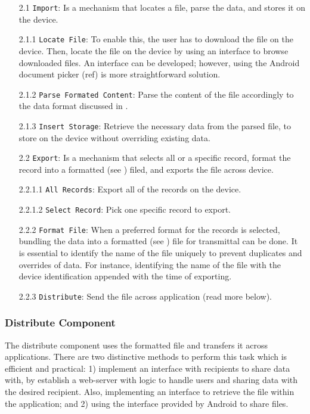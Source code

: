 \begin{itemize}
    \item[2.1] \verb|Import|: Is a mechanism that locates a file, parse the data, and stores it on the device.
    \item[2.1.1] \verb|Locate File|: To enable this, the user has to download the file on the device. Then, locate the file on the device by using an interface to browse downloaded files. An interface can be developed; however, using the Android document picker (ref) is more straightforward solution.
    \item[2.1.2] \verb|Parse Formated Content|: Parse the content of the file accordingly to the data format discussed in .
    \item[2.1.3] \verb|Insert Storage|: Retrieve the necessary data from the parsed file, to store on the device without overriding existing data.   
    \item[2.2] \verb|Export|: Is a mechanism that selects all or a specific record, format the record into a formatted (see ) filed, and exports the file across device. 
    \item[2.2.1.1] \verb|All Records|: Export all of the records on the device.
    \item[2.2.1.2] \verb|Select Record|: Pick one specific record to export. 
    \item[2.2.2] \verb|Format File|: When a preferred format for the records is selected, bundling the data into a formatted (see ) file for transmittal can be done. It is essential to identify the name of the file uniquely to prevent duplicates and overrides of data. For instance, identifying the name of the file with the device identification appended with the time of exporting. 
    \item[2.2.3] \verb|Distribute|: Send the file across application (read more below).
\end{itemize}

\subsubsection{Distribute Component}
The distribute component uses the formatted file and transfers it across applications. There are two distinctive methods to perform this task which is efficient and practical: 1) implement an interface with recipients to share data with, by establish a web-server with logic to handle users and sharing data with the desired recipient. Also, implementing an interface to retrieve the file within the application;  and 2) using the interface provided by Android to share files. 

